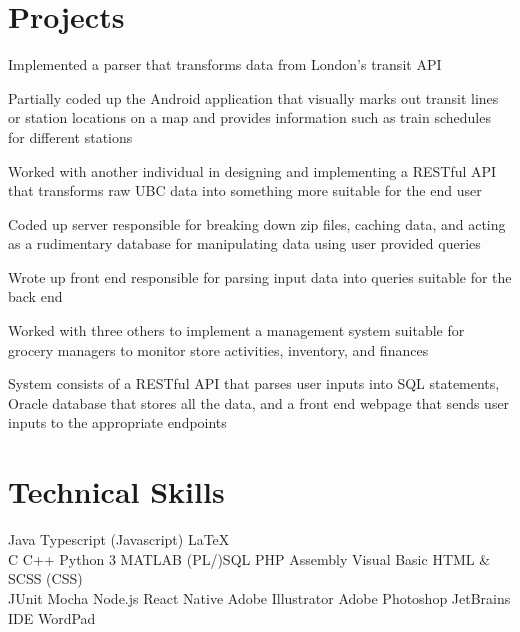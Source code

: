 \documentclass[]{deedy-resume-openfont}
\begin{document}
\section{Projects}

\begin{tightemize}
\item Implemented a parser that transforms data from London's transit API
\item Partially coded up the Android application that visually marks out transit lines or station locations on a map and provides information such as train schedules for different stations
\end{tightemize}
\sectionsep

\begin{tightemize}
\item Worked with another individual in designing and implementing a RESTful API that transforms raw UBC data into something more suitable for the end user
\item Coded up server responsible for breaking down zip files, caching data, and acting as a rudimentary database for manipulating data using user provided queries
\item Wrote up front end responsible for parsing input data into queries suitable for the back end
\end{tightemize}
\sectionsep

\begin{tightemize}
\item Worked with three others to implement a management system suitable for grocery managers to monitor store activities, inventory, and finances
\item System consists of a RESTful API that parses user inputs into SQL statements, Oracle database that stores all the data, and a front end webpage that sends user inputs to the appropriate endpoints
\end{tightemize}
\sectionsep

\section{Technical Skills}
Java \textbullet{} Typescript (Javascript) \textbullet{} \LaTeX\\ 
C \textbullet{} C++ \textbullet{} Python 3 \textbullet{} MATLAB \textbullet{} (PL/)SQL \textbullet{} PHP \textbullet{} Assembly \textbullet{} Visual Basic \textbullet{} HTML \& SCSS (CSS)\\
JUnit \textbullet{} Mocha \textbullet{} Node.js \textbullet{} React Native \textbullet{} Adobe Illustrator \textbullet{} Adobe Photoshop \textbullet{} JetBrains IDE \textbullet{} WordPad
\sectionsep
\end{document}

